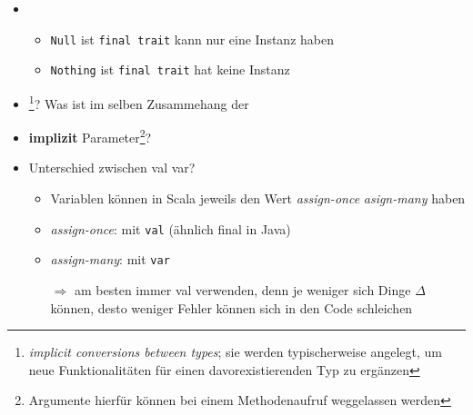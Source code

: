 \begin{itemize}
  \item {}

  \begin{itemize}
    \item \texttt{Null} ist \texttt{final trait} \und kann nur eine 
    Instanz haben
    \item \texttt{Nothing} ist \texttt{final trait} \und hat keine Instanz
  \end{itemize}

  \item {}\footnote{\textit{implicit conversions between
  types}; sie werden typischerweise angelegt, um neue Funktionalitäten
  für einen davorexistierenden Typ zu ergänzen}? Was ist im selben 
  Zusammehang der 
  \item \textbf{implizit} Parameter\footnote{Argumente hierfür können 
  bei einem Methodenaufruf weggelassen werden}?
  \item Unterschied zwischen val \und var?
  \begin{itemize}
    \item Variablen können in Scala jeweils den Wert 
    \textit{assign-once} \oder \textit{asign-many} haben
    \item \textit{assign-once}: mit \texttt{val} (ähnlich final
    in Java)
    \item \textit{assign-many}: mit \texttt{var}
    
    $\Rightarrow$ am besten immer val verwenden, denn je weniger
    sich Dinge $\Delta$ können, desto weniger Fehler können sich
    in den Code schleichen
  \end{itemize}
  

\end{itemize}
